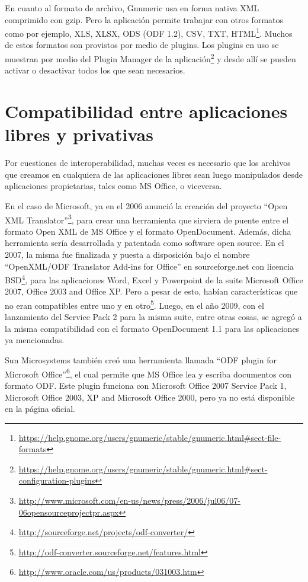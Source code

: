 \documentclass[12pt]{article}
\begin{document}
En cuanto al formato de archivo, Gnumeric usa en forma nativa XML comprimido con gzip. Pero la aplicación permite trabajar con otros formatos como por ejemplo, XLS, XLSX, ODS (ODF 1.2), CSV, TXT, HTML\footnote{\url{https://help.gnome.org/users/gnumeric/stable/gnumeric.html\#sect-file-formats}}. Muchos de estos formatos son provistos por medio de plugins. Los plugins en uso se muestran por medio del Plugin Manager de la aplicación\footnote{\url{https://help.gnome.org/users/gnumeric/stable/gnumeric.html\#sect-configuration-plugins}} y desde allí se pueden activar o desactivar todos los que sean necesarios. 

\section{Compatibilidad entre aplicaciones libres y privativas}

Por cuestiones de interoperabilidad, muchas veces es necesario que los archivos que creamos en cualquiera de las aplicaciones libres sean luego manipulados desde aplicaciones propietarias, tales como MS Office, o viceversa. 

En el caso de Microsoft, ya en el 2006 anunció la creación del proyecto ``Open XML Translator''\footnote{\url{http://www.microsoft.com/en-us/news/press/2006/jul06/07-06opensourceprojectpr.aspx}}, para crear una herramienta que sirviera de puente entre el formato Open XML de MS Office y el formato OpenDocument. Además, dicha herramienta sería desarrollada y patentada como software open source. En el 2007, la misma fue finalizada y puesta a disposición bajo el nombre ``OpenXML/ODF Translator Add-ins for Office'' en sourceforge.net con licencia BSD\footnote{\url{http://sourceforge.net/projects/odf-converter/}}, para las aplicaciones Word, Excel y Powerpoint de la suite Microsoft Office 2007, Office 2003 and Office XP. Pero a pesar de esto, habían características que no eran compatibles entre uno y en otro\footnote{\url{http://odf-converter.sourceforge.net/features.html}}. Luego, en el año 2009, con el lanzamiento del Service Pack 2 para la misma suite, entre otras cosas, se agregó a la misma compatibilidad con el formato OpenDocument 1.1 para las aplicaciones ya mencionadas.

Sun Microsystems también creó una herramienta llamada ``ODF plugin for Microsoft Office''\footnote{\url{http://www.oracle.com/us/products/031003.htm}}, el cual permite que MS Office lea y escriba documentos con formato ODF. Este plugin funciona con Microsoft Office 2007 Service Pack 1, Microsoft Office 2003, XP and Microsoft Office 2000, pero ya no está disponible en la página oficial.
\end{document}
